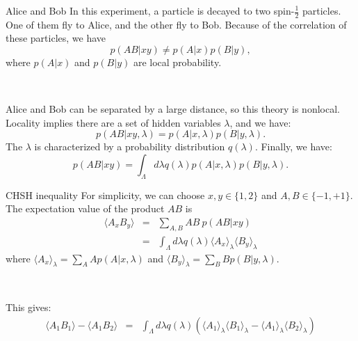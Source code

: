 \documentclass{beamer}
\begin{document}
    \begin{frame}{Alice and Bob}
        In this experiment, a particle is decayed to two spin-$\frac{1}{2}$ particles. One of them fly to Alice, and the other fly to Bob. Because of the correlation of these particles, we have 
        \begin{equation*}
            p(AB|xy) \neq p(A|x)p(B|y),
        \end{equation*}
        where $p(A|x)$ and $p(B|y)$ are local probability. 

        ~
        
        Alice and Bob can be separated by a large distance, so this theory is nonlocal. 
        Locality implies there are a set of hidden variables $\lambda$, and we have:
        \begin{equation*}
            p(AB|xy, \lambda) = p(A|x, \lambda)p(B|y, \lambda).
        \end{equation*}
        The $\lambda$ is characterized by a probability distribution $q(\lambda)$. Finally, we have:
        \begin{equation*}
            p(AB|xy) = \int_\Lambda d\lambda q(\lambda)p(A|x, \lambda)p(B|y, \lambda).
        \end{equation*}       
    \end{frame}

    \begin{frame}{CHSH inequality}
        For simplicity, we can choose $x,y\in \{1,2\}$ and $A,B\in\{-1, +1\}$. The expectation value of the product $AB$ is 
        \begin{eqnarray}
            \langle A_xB_y\rangle &=& \sum_{A,B}AB\ p(AB|xy) \nonumber \\
            &=& \int_\Lambda d\lambda q(\lambda)\langle  A_x\rangle_\lambda\langle B_y\rangle_\lambda \nonumber 
        \end{eqnarray}
        where $\langle  A_x\rangle_\lambda =\sum_AAp(A|x,\lambda)$ and $\langle  B_y\rangle_\lambda =\sum_BBp(B|y,\lambda)$.
    
        ~
        
        This gives:
        \begin{eqnarray}
            \langle A_1B_1\rangle - \langle A_1B_2\rangle &=& \int_\Lambda d\lambda q(\lambda) \left(\langle  A_1\rangle_\lambda\langle B_1\rangle_\lambda - \langle  A_1\rangle_\lambda\langle B_2\rangle_\lambda\right) \nonumber
        \end{eqnarray}
    \end{frame}
\end{document}
